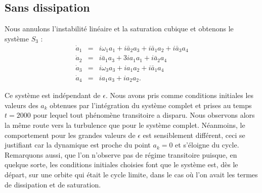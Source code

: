 \documentclass{book}
\begin{document}
\subsection{Sans dissipation}
Nous annulons l'instabilit\'e lin\'eaire et la saturation
cubique et
obtenons le syst\`eme $S_3$ :
\begin{eqnarray}
\dot{a}_1&=&i\omega_1a_1+i\bar{a}_2{a}_3+i\bar{a}_1a_2+i\bar{a}_3a_4\\
\dot{a}_2&=&i\bar{a}_1{a}_3+3ia_1a_1+i\bar{a}_2a_4\\
\dot{a}_3&=&i\omega_3a_3+ia_1a_2+i\bar{a}_1a_4\\
\dot{a}_4&=&ia_1a_3+ia_2a_2.
\end{eqnarray}

Ce syst\`eme est ind\'ependant de $\epsilon$. Nous avons pris comme
conditions initiales les valeurs des $a_k$ obtenues par l'int\'egration
du syst\`eme complet et prises au temps $t=2000$ pour lequel tout
ph\'enom\`ene transitoire a disparu.
Nous observons alors la m\^eme route vers la turbulence que pour le
syst\`eme complet.
N\'eanmoins, le comportement pour les grandes valeurs de $\epsilon$ est
sensiblement diff\'erent, ceci se justifiant car la dynamique est
proche du 
point $a_k=0$ et s'\'eloigne du cycle.
Remarquons aussi, que l'on n'observe pas de r\'egime transitoire
puisque, en quelque sorte, les conditions initiales choisies font que
le syst\`eme est, d\`es le d\'epart, sur une orbite qui \'etait le cycle
limite, dans le cas o\`u l'on avait les termes de dissipation et de
saturation.
 
\end{document}
